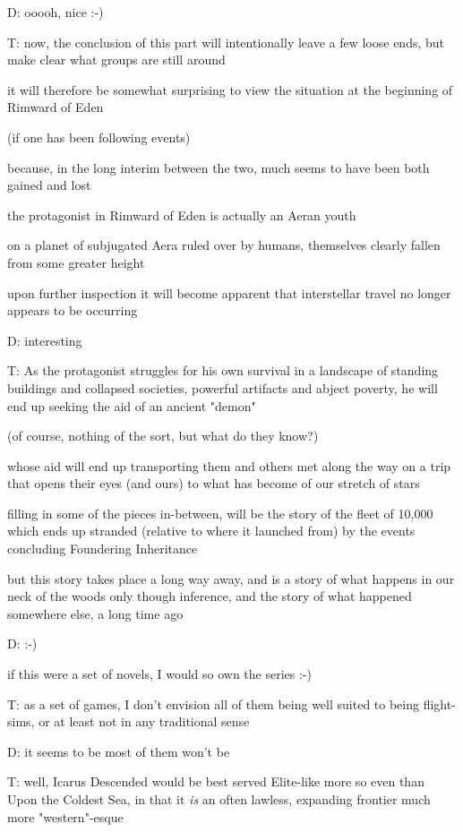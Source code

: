 {D: ooooh, nice :-)

T: now, the conclusion of this part will intentionally leave a few loose ends, but make clear what groups are still around

it will therefore be somewhat surprising to view the situation at the beginning of Rimward of Eden

(if one has been following events)

because, in the long interim between the two, much seems to have been both gained and lost

the protagonist in Rimward of Eden is actually an Aeran youth

on a planet of subjugated Aera ruled over by humans, themselves clearly fallen from some greater height 

upon further inspection it will become apparent that interstellar travel no longer appears to be occurring

D: interesting

T: As the protagonist struggles for his own survival in a landscape of standing buildings and collapsed societies, powerful artifacts and abject poverty, he will end up seeking the aid of an ancient "demon"

(of course, nothing of the sort, but what do they know?)

whose aid will end up transporting them and others met along the way on a trip that opens their eyes (and ours) to what has become of our stretch of stars

filling in some of the pieces in-between, will be the story of the fleet of 10,000 which ends up stranded (relative to where it launched from) by the events concluding Foundering Inheritance

but this story takes place a long way away, and is a story of what happens in our neck of the woods only though inference, and the story of what happened somewhere else, a long time ago

D: :-)

if this were a set of novels, I would so own the series :-)

T: as a set of games, I don't envision all of them being well suited to being flight-sims, or at least not in any traditional sense

D: it seems to be most of them won't be

T: well, Icarus Descended would be best served Elite-like
more so even than Upon the Coldest Sea, in that it {\em is} an often lawless, expanding frontier
much more "western"-esque

}
